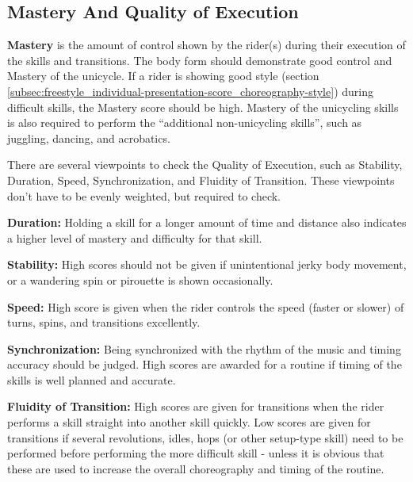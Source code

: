 \subsection{Mastery And Quality of Execution}
\textbf{Mastery} is the amount of control shown by the rider(s) during their execution of the skills and transitions.
The body form should demonstrate good control and Mastery of the unicycle.
If a rider is showing good style (section \ref{subsec:freestyle_individual-presentation-score_choreography-style}) during difficult skills, the Mastery score should be high.
Mastery of the unicycling skills is also required to perform the ``additional non-unicycling skills'', such as juggling, dancing, and acrobatics.

There are several viewpoints to check the Quality of Execution, such as Stability, Duration, Speed, Synchronization, and Fluidity of Transition.
These viewpoints don't have to be evenly weighted, but required to check.

\textbf{Duration:} Holding a skill for a longer amount of time and distance also indicates a higher level of mastery and difficulty for that skill.

\textbf{Stability:} High scores should not be given if unintentional jerky body movement, or a wandering spin or pirouette is shown occasionally.

\textbf{Speed:} High score is given when the rider controls the speed (faster or slower) of turns, spins, and transitions excellently.

\textbf{Synchronization:} Being synchronized with the rhythm of the music and timing accuracy should be judged.
High scores are awarded for a routine if timing of the skills is well planned and accurate.

\textbf{Fluidity of Transition:} High scores are given for transitions when the rider performs a skill straight into another skill quickly.
Low scores are given for transitions if several revolutions, idles, hops (or other setup-type skill) need to be performed before performing the more difficult skill - unless it is obvious that these are used to increase the overall choreography and timing of the routine.

